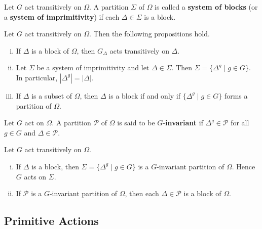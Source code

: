 \begin{definition}
	Let $G$ act transitively on $\Omega$. A partition $\Sigma$ of $\Omega$ is called a \textbf{system of blocks} (or a \textbf{system of imprimitivity}) if each $\Delta\in \Sigma$ is a block.
\end{definition}
\begin{proposition}
	Let $G$ act transitively on $\Omega$.  Then the following propositions hold.
	\begin{enumerate}[(i)]
		\item If $\Delta$ is a block of $\Omega$, then $G_{\Delta}$ acts transitively on $\Delta$. 
		\item Let $\Sigma$ be a system of imprimitivity and let $\Delta\in \Sigma$. Then
		$\Sigma  = \{\Delta^g\mid g\in G\}$. In particular, $|\Delta^g| = |\Delta|$.
		\item If $\Delta$ is a subset of $\Omega$, then $\Delta$ is a block if and only if $\{\Delta^g\mid g\in G\}$ forms a partition of $\Omega$.
	\end{enumerate}  
\end{proposition}
\begin{sketch}
	
\end{sketch}

\begin{definition}
	Let $G$ act on $\Omega$. A partition $\mathcal{P}$ of $\Omega$ is said to be $G$-\textbf{invariant} if $\Delta^g \in\mathcal{P}$ for all $g\in G$ and $\Delta\in\mathcal{P}$.
\end{definition}
\begin{proposition}
	Let $G$ act transitively on $\Omega$.
	\begin{enumerate}[(i)]
		\item  If  $\Delta$ is a block, then $\Sigma = \{\Delta^g\mid g\in G\}$ is a $G$-invariant partition of $\Omega$. Hence $G$ acts on $\Sigma$.
		\item If $\mathcal{P}$ is a $G$-invariant partition of $\Omega$, then each $\Delta\in \mathcal{P}$ is a block of $\Omega$.
	\end{enumerate}
\end{proposition}
\begin{sketch}
	
\end{sketch}

\subsection{Primitive Actions}


